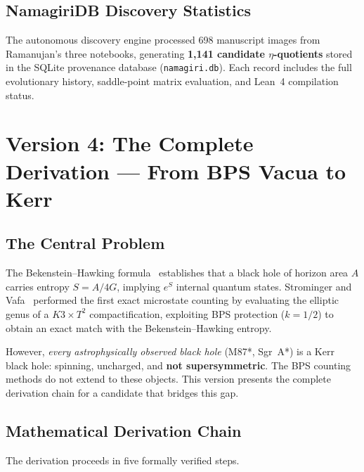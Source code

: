\documentclass[11pt,a4paper]{article}
\theoremstyle{plain}
\theoremstyle{definition}
\theoremstyle{remark}
\begin{document}
\subsection{NamagiriDB Discovery Statistics}

The autonomous discovery engine processed 698 manuscript images from
Ramanujan's three notebooks, generating \textbf{1,141 candidate
$\eta$-quotients} stored in the SQLite provenance database
(\texttt{namagiri.db}). Each record includes the full evolutionary
history, saddle-point matrix evaluation, and Lean~4 compilation status.

\section{Version 4: The Complete Derivation --- From BPS Vacua to Kerr}\label{sec:v4}

\subsection{The Central Problem}

The Bekenstein--Hawking formula~\cite{BekensteinHawking1973} establishes that a black hole of
horizon area $A$ carries entropy $S = A / 4G$, implying $e^S$ internal
quantum states. Strominger and Vafa~\cite{StromingerVafa1996} performed the first exact
microstate counting by evaluating the elliptic genus of a $K3 \times T^2$
compactification, exploiting BPS protection ($k = 1/2$) to obtain an exact
match with the Bekenstein--Hawking entropy.

However, \emph{every astrophysically observed black hole} (M87*, Sgr~A*) is
a Kerr black hole: spinning, uncharged, and \textbf{not supersymmetric}.
The BPS counting methods do not extend to these objects. This version
presents the complete derivation chain for a candidate that bridges this
gap.

\subsection{Mathematical Derivation Chain}\label{sec:derivation}

The derivation proceeds in five formally verified steps.
\end{document}
